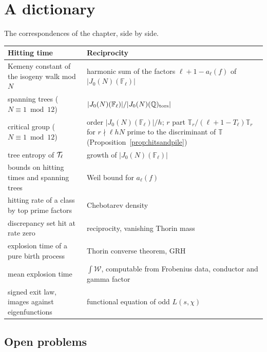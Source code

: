 \section{A dictionary}\label{sec:hitdictionary}

The correspondences of the chapter, side by side.

\begin{center}\small
\begin{tabular}{p{}p{}}
\toprule
Hitting time & Reciprocity\\
\midrule
Kemeny constant of the isogeny walk mod $N$ & harmonic sum of the factors $\ell+1-a_\ell(f)$ of $|J_0(N)(\mathbb F_\ell)|$\\
spanning trees ($N\equiv1\bmod12$) & $|J_0(N)(\mathbb F_\ell)|/|J_0(N)(\mathbb{Q})_{\mathrm{tors}}|$\\
critical group ($N\equiv1\bmod12$) & order $|J_0(N)(\mathbb F_\ell)|/h$; $r$ part $\mathbb T_r/(\ell+1-T_\ell)\mathbb T_r$ for $r\nmid\ell hN$ prime to the discriminant of $\mathbb T$ (Proposition~\ref{prop:hitsandpile})\\
tree entropy of $\mathcal{T}_\ell$ & growth of $|J_0(N)(\mathbb F_\ell)|$\\
bounds on hitting times and spanning trees & Weil bound for $a_\ell(f)$\\
hitting rate of a class by top prime factors & Chebotarev density\\
discrepancy set hit at rate zero & reciprocity, vanishing Thorin mass\\
explosion time of a pure birth process & Thorin converse theorem, GRH\\
mean explosion time & $\int\mathcal W$, computable from Frobenius data, conductor and gamma factor\\
signed exit law, images against eigenfunctions & functional equation of odd $L(s,\chi)$\\
\bottomrule
\end{tabular}
\end{center}

\subsection{Open problems}

